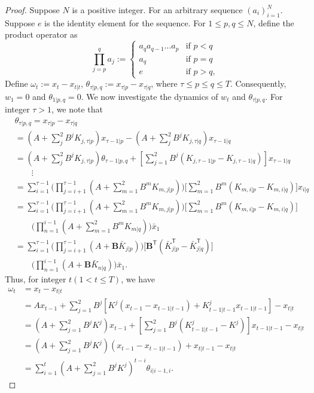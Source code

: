 \documentclass[letterpaper, 10 pt, conference]{ieeeconf}  %
\begin{document}
\begin{proof}
    Suppose $N$ is a positive integer. For an arbitrary sequence $(a_{i})_{i=1}^{N}$. Suppose $e$ is the identity element for the sequence. For $1\leq p,q\leq N$, define the product operator as
\begin{equation}
    \prod_{j=p}^{q} a_{j} := 
    \begin{cases}
        a_{q}a_{q-1}\dots a_{p} & \text{if $p < q$}\\
        a_{q} & \text{if $p = q$}\\
        e & \text{if $p > q$},
    \end{cases}
\end{equation}
Define $\omega_{t} := x_{t}-x_{t|t}$, $\theta_{\tau| p,q} := x_{\tau|p}-x_{\tau|q}$, where $\tau \leq p\leq q\leq T$. Consequently, $w_{1} = 0$ and $\theta_{1|p,q}=0$. We now investigate the dynamics of $w_{t}$ and $\theta_{\tau|p,q}$. For integer $\tau > 1$, we note that
\begin{align*}
    &\theta_{\tau|p,q}= x_{\tau|p}-x_{\tau|q}\\
    &= (A+\sum_{j}^{2}B^{j}K_{j,\tau|p})x_{\tau-1|p} - (A+\sum_{j}^{2}B^{j}K_{j,\tau|q})x_{\tau-1|q}\\
    &= (A+\sum_{j}^{2}B^{j}K_{j,\tau|p})\theta_{\tau-1|p,q} + [\sum_{j=1}^{2} B^{j}(K_{j,\tau-1|p}-K_{j,\tau-1|q})]x_{\tau-1|q}\\
    &\qquad \vdots\\
    &= \sum_{i=1}^{\tau-1}\bigg(\prod_{j=i+1}^{\tau-1}(A+\sum_{m=1}^{2}B^{m}K_{m,j|p})\bigg)\bigg[\sum_{m=1}^{2}B^{m}(K_{m,i|p}-K_{m,i|q})\bigg]x_{i|q}  \\
    &= \sum_{i=1}^{\tau-1}\bigg(\prod_{j=i+1}^{\tau-1}(A+\sum_{m=1}^{2}B^{m}K_{m,j|p})\bigg)\bigg[\sum_{m=1}^{2}B^{m}(K_{m,i|p}-K_{m,i|q})\bigg]\\
    &\qquad\bigg(\prod_{n=1}^{i-1} (A+\sum_{m=1}^{2}B^{m}K_{m|q})\bigg)\bar{x}_{1}\\
    &= \sum_{i=1}^{\tau-1}\bigg(\prod_{j=i+1}^{\tau-1}(A+\mathbf{B}\bar{K}_{j|p})\bigg)\bigg[\mathbf{B}^{\mathsf{T}}(\bar{K}_{j|p}^{\mathsf{T}}-\bar{K}_{j|q}^{\mathsf{T}})\bigg]\\
    &\qquad\bigg(\prod_{n=1}^{i-1}(A+\mathbf{B}\bar{K}_{n|q})\bigg)\bar{x}_{1}.
\end{align*}
Thus, for integer $t(1 < t\leq T)$, we have
\begin{align*}
    \omega_{t} &= x_{t} - x_{t|t}\\
    &= Ax_{t-1} + \sum_{j=1}^{2}B^{j}[K^{j}(x_{t-1}-x_{t-1|t-1})+K_{t-1|t-1}^{j}x_{t-1|t-1}] - x_{t|t}\\
    &= (A+\sum_{j=1}^{2}B^{j}K^{j})x_{t-1} + [\sum_{j=1}^{2}B^{j}(K_{t-1|t-1}^{j}-K^{j})]x_{t-1|t-1} - x_{t|t}\\
    &= (A+\sum_{j=1}^{2}B^{j}K^{j})(x_{t-1}-x_{t-1|t-1}) + x_{t|t-1}-x_{t|t}\\
    &= \sum_{i=1}^{t} (A+\sum_{j=1}^{2}B^{j}K^{j})^{t-i} \theta_{i|i-1,i}.
\end{align*}


\end{proof}
\end{document}
